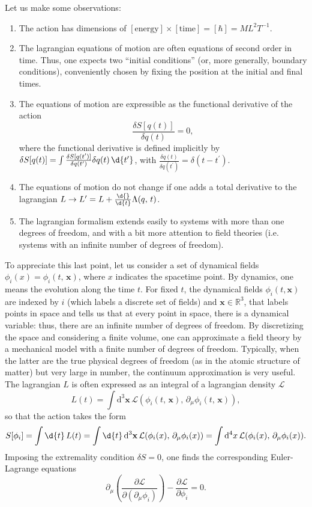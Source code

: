 Let us make some observations:
\begin{enumerate}
    \item The action has dimensions of \([\text{energy}] \times [\text{time}] = [\hbar] = M L^2 T^{-1}\).
    \item The lagrangian equations of motion are often equations of second order in time. Thus, one expects two “initial conditions” (or, more generally, boundary conditions), conveniently chosen by fixing the position at the initial and final times.
    \item The equations of motion are expressible as the functional derivative of the action
          \[
              \frac{\delta S[q(t)]}{\delta q(t)} = 0,
          \]
          where the functional derivative is defined implicitly by \(\delta S[q(t)]= \int \frac{\delta S[q(t^{\prime})]}{\delta q(t^{\prime})} \delta q(t) \, \d{t^{\prime}}\), with \(\frac{\delta q(t)}{\delta q(t^{\prime})} = \delta(t - t^{\prime})\).
    \item The equations of motion do not change if one adds a total derivative to the lagrangian \(L \to L^{\prime} = L + \frac{\d{}}{\d{t}} \Lambda(q,\,t)\).
    \item The lagrangian formalism extends easily to systems with more than one degrees of freedom, and with a bit more attention to field theories (i.e. systems with an infinite number of degrees of freedom).
\end{enumerate}
To appreciate this last point, let us consider a set of dynamical fields \(\phi_i (x) = \phi_i (t,\,\mathbf{x})\), where $x$ indicates the spacetime point. By dynamics, one means the evolution along the time \(t\). For fixed $t$, the dynamical fields \(\phi_i(t, \mathbf{x})\) are indexed by \(i\) (which labels a discrete set of fields) and \(\mathbf{x} \in \mathbb{R}^3\), that labels points in space and tells us that at every point in space, there is a dynamical variable: thus, there are an infinite number of degrees of freedom. By discretizing the space and considering a finite volume, one can approximate a field theory by a mechanical model with a finite number of  degrees of freedom. Typically, when the latter are the true physical degrees of freedom (as in the atomic structure of matter) but very large in number, the continuum approximation is very useful. The lagrangian \(L\) is often expressed as an integral of a lagrangian density \(\mathcal{L}\)
\[
    L(t) = \int \mathrm{d}^3 \mathbf{x} \, \mathcal{L}(\phi_i (t,\,\mathbf{x}),\,\partial_{\mu} \phi_i (t,\,\mathbf{x})),
\]
so that the action takes the form
\[
    S[\phi_i] = \int \d{t} \, L(t) = \int \d{t} \, \mathrm{d}^3 \mathbf{x} \, \mathcal{L}(\phi_i (x),\,\partial_{\mu} \phi_i (x)) = \int \mathrm{d}^4x \, \mathcal{L}(\phi_i (x),\,\partial_{\mu} \phi_i (x)).
\]
Imposing the extremality condition \(\delta S = 0\), one finds the corresponding Euler-Lagrange equations
\[
    \partial_\mu \left( \frac{\partial \mathcal{L}}{\partial (\partial_\mu \phi_i)} \right) - \frac{\partial \mathcal{L}}{\partial \phi_i} = 0.
\]

